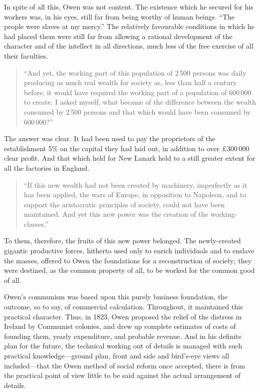 In spite of all this, Owen was not content. The existence which he secured for
his workers was, in his eyes, still far from being worthy of human beings. ``The
people were slaves at my mercy.'' The relatively favourable conditions in which
he had placed them were still far from allowing a rational development of the
character and of the intellect in all directions, much less of the free exercise
of all their faculties.
%
\begin{quote}
  ``And yet, the working part of this population of 2\,500 persons was daily
  producing as much real wealth for society as, less than half a century
  before, it would have required the working part of a population of 600\,000
  to create. I asked myself, what became of the difference between the wealth
  consumed by 2\,500 persons and that which would have been consumed by
  600\,000?''
\end{quote}
%
The answer was clear. It had been used to pay the proprietors of the
establishment 5\% on the capital they had laid out, in addition to over
£300\,000 clear profit. And that which held for New Lanark held to a still
greater extent for all the factories in England.
%
\begin{quote}
  ``If this new wealth had not been created by machinery, imperfectly as it has
  been applied, the wars of Europe, in opposition to Napoleon, and to support
  the aristocratic principles of society, could not have been maintained. And
  yet this new power was the creation of the working-classes.'' %
\end{quote}
%
To them, therefore, the fruits of this new power belonged. The newly-created
gigantic productive forces, hitherto used only to enrich individuals and to
enslave the masses, offered to Owen the foundations for a reconstruction of
society; they were destined, as the common property of all, to be worked for the
common good of all.

Owen's communism was based upon this purely business foundation, the outcome, so
to say, of commercial calculation. Throughout, it maintained this practical
character. Thus, in 1823, Owen proposed the relief of the distress in Ireland by
Communist colonies, and drew up complete estimates of costs of founding them,
yearly expenditure, and probable revenue. And in his definite plan for the
future, the technical working out of details is managed with such practical
knowledge---ground plan, front and side and bird's-eye views all
included---that the Owen method of social reform once accepted, there is from
the practical point of view little to be said against the actual arrangement of
details.

